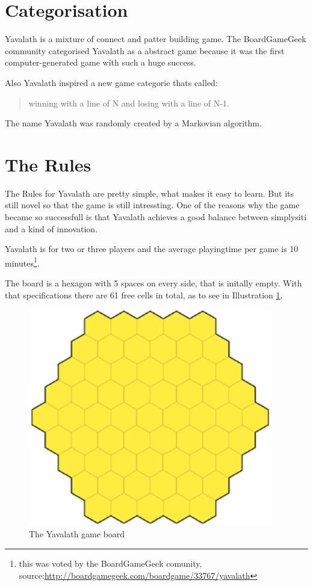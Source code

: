 \documentclass[english]{report}
\begin{document}
\section{Categorisation}
Yavalath is a mixture of connect and patter building game. The BoardGameGeek
community categorised Yavalath as a abstract game because it was the first
computer-generated game with such a huge success.

Also Yavalath inspired a new game categorie thats called:
\begin{quote}
	winning with a line of N and losing with a line of N-1.
\end{quote}

The name Yavalath was randomly created by a Markovian algorithm.

\section{The Rules}
The Rules for Yavalath are pretty simple, what makes it easy to learn. But its
still novel so that the game is still intressting. 
One of the reasons why the game became so successfull is that Yavalath achieves
a good balance between simplysiti and a kind of innovation.

Yavalath is for two or three players and the average playingtime per game is 10 minutes\footnote{this was voted by the BoardGameGeek comunity, source:\url{http://boardgamegeek.com/boardgame/33767/yavalath}}.

The board is a hexagon with 5 spaces on every side, that is initally empty.
With that specifications there are 61 free cells in total, as to see in Illustration \ref{fig:yav_board}.

\begin{figure}[ht]
\centering
\includegraphics[width=0.95\textwidth]{Abbildungen/yav_emptyBoard.png}
\caption[The Yavalath game board, Source:\cite{yvalath}]{The Yavalath game board}
\label{fig:yav_board}
\end{figure}
\end{document}
